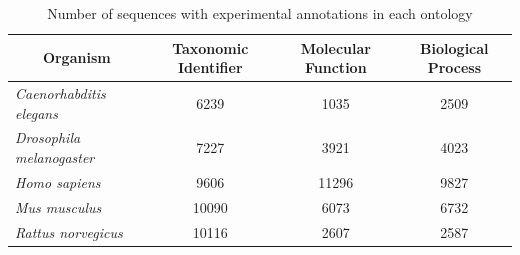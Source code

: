 \begin{table}[h]

\caption[Number of sequences with experimental annotations]{Number of sequences with experimental annotations in each ontology}

	\begin{tabular}{|l|c| c c|}
		\hline
		\multicolumn{1}{|c|}{Organism} & \multicolumn{1}{p{2cm}|}{\centering Taxonomic Identifier} & \multicolumn{1}{p{2cm}}{\centering Molecular Function} & \multicolumn{1}{p{2cm}|}{\centering Biological Process}\\
		\hline
		\emph{Caenorhabditis elegans} & 6239 & 1035 & 2509\\
		\emph{Drosophila melanogaster} & 7227 & 3921 & 4023\\
		\emph{Homo sapiens} & 9606 & 11296 & 9827\\
		\emph{Mus musculus} & 10090 & 6073 & 6732\\
		\emph{Rattus norvegicus} & 10116 & 2607 & 2587\\
		\hline
	\end{tabular}
\label{tab:ocfuncounts}
\end{table}
